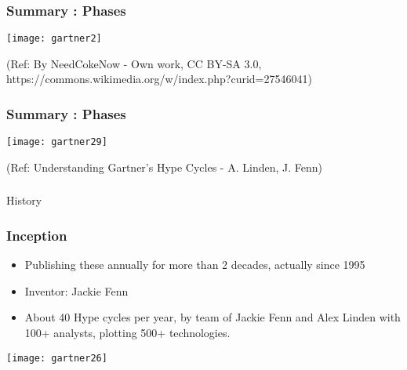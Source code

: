 \begin{frame}[fragile]\frametitle{Summary : Phases}

\begin{center}
\texttt{[image: gartner2]}
\end{center}

{\tiny (Ref: By NeedCokeNow - Own work, CC BY-SA 3.0, https://commons.wikimedia.org/w/index.php?curid=27546041)}
\end{frame}

\begin{frame}[fragile]\frametitle{Summary : Phases}

\begin{center}
\texttt{[image: gartner29]}
\end{center}

{\tiny (Ref: Understanding Gartner's Hype Cycles - A. Linden, J. Fenn)}
\end{frame}


\begin{frame}[fragile]\frametitle{}
\begin{center}
{\Large History}
\end{center}
\end{frame}

\begin{frame}[fragile]\frametitle{Inception}

\begin{itemize}
\item Publishing these annually for more than 2 decades, actually since 1995
\item Inventor: Jackie Fenn
\item About 40 Hype cycles per year, by team of Jackie Fenn and Alex Linden with 100+ analysts, plotting 500+ technologies.
\end{itemize}

\begin{center}
\texttt{[image: gartner26]}
\end{center}

\end{frame}


